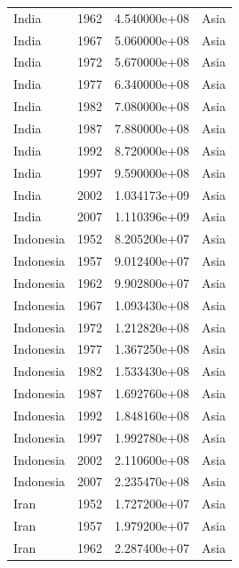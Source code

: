 \documentclass[
  letterpaper,
  DIV=11,
  numbers=noendperiod]{scrreprt}
\begin{document}
\begin{tcolorbox}
\begin{tabular}{lrrl}
India                    &  1962 &  4.540000e+08 &      Asia \\
India                    &  1967 &  5.060000e+08 &      Asia \\
India                    &  1972 &  5.670000e+08 &      Asia \\
India                    &  1977 &  6.340000e+08 &      Asia \\
India                    &  1982 &  7.080000e+08 &      Asia \\
India                    &  1987 &  7.880000e+08 &      Asia \\
India                    &  1992 &  8.720000e+08 &      Asia \\
India                    &  1997 &  9.590000e+08 &      Asia \\
India                    &  2002 &  1.034173e+09 &      Asia \\
India                    &  2007 &  1.110396e+09 &      Asia \\
Indonesia                &  1952 &  8.205200e+07 &      Asia \\
Indonesia                &  1957 &  9.012400e+07 &      Asia \\
Indonesia                &  1962 &  9.902800e+07 &      Asia \\
Indonesia                &  1967 &  1.093430e+08 &      Asia \\
Indonesia                &  1972 &  1.212820e+08 &      Asia \\
Indonesia                &  1977 &  1.367250e+08 &      Asia \\
Indonesia                &  1982 &  1.533430e+08 &      Asia \\
Indonesia                &  1987 &  1.692760e+08 &      Asia \\
Indonesia                &  1992 &  1.848160e+08 &      Asia \\
Indonesia                &  1997 &  1.992780e+08 &      Asia \\
Indonesia                &  2002 &  2.110600e+08 &      Asia \\
Indonesia                &  2007 &  2.235470e+08 &      Asia \\
Iran                     &  1952 &  1.727200e+07 &      Asia \\
Iran                     &  1957 &  1.979200e+07 &      Asia \\
Iran                     &  1962 &  2.287400e+07 &      Asia \\

\end{tabular}
\end{tcolorbox}
\end{document}
